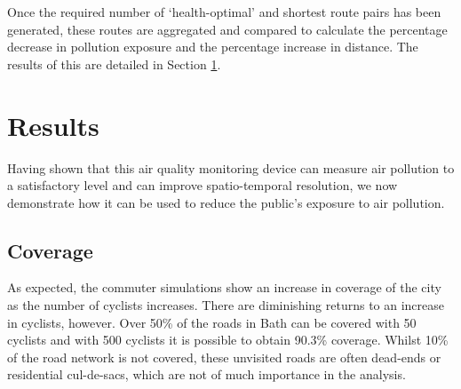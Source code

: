 \documentclass[11pt,twosided,a4paper]{report}
\begin{document}
Once the required number of `health-optimal' and shortest route pairs has been generated, these routes are aggregated and compared to calculate the percentage decrease in pollution exposure and the percentage increase in distance. The results of this are detailed in Section \ref{results:q3}.


\section{Results} \label{results:q3}

Having shown that this air quality monitoring device can measure air pollution to a satisfactory level and can improve spatio-temporal resolution, we now demonstrate how it can be used to reduce the public's exposure to air pollution.

\subsection{Coverage}

As expected, the commuter simulations show an increase in coverage of the city as the number of cyclists increases. There are diminishing returns to an increase in cyclists, however. Over 50\% of the roads in Bath can be covered with 50 cyclists and with 500 cyclists it is possible to obtain 90.3\% coverage. Whilst 10\% of the road network is not covered, these unvisited roads are often dead-ends or residential cul-de-sacs, which are not of much importance in the analysis.


\end{document}
